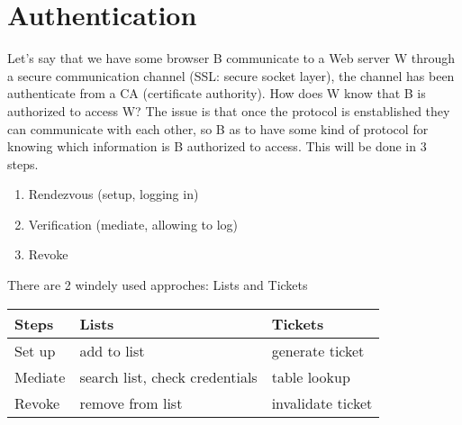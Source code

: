 \documentclass{article}
\begin{document}
      \section{Authentication}
        Let's say that we have some browser B communicate to a Web server W through a secure 
        communication channel (SSL: secure socket layer), the channel has been authenticate from
        a CA (certificate authority). How does W know that B is authorized to access W? The issue
        is that once the protocol is enstablished they can communicate with each other, so B as
        to have some kind of protocol for knowing which information is B authorized to access.
        This will be done in 3 steps.
        \begin{enumerate}
          \item Rendezvous (setup, logging in)
          \item Verification (mediate, allowing to log)
          \item Revoke
        \end{enumerate}
        There are 2 windely used approches: Lists and Tickets \\
        \begin{tabular}{ | l | l | l |}
          \hline
          Steps & Lists & Tickets \\ \hline
          Set up & add to list & generate ticket \\ \hline
          Mediate & search list, check credentials & table lookup \\ \hline
          Revoke & remove from list & invalidate ticket \\ \hline
        \end{tabular}
\end{document}
